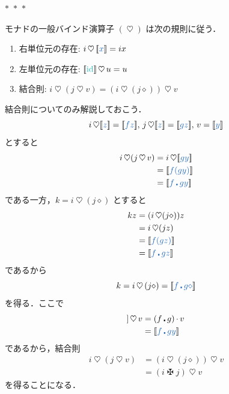 \documentclass[a5paper,twoside,fleqn,draft]{jsbook}
\def\[{[\![}
\def\]{]\!]}
\def\varColor{NavyBlue}
\def\funcColor{BlueGreen}
\newcommand{\separator}{\begin{center}$*$~$*$~$*$\end{center}}
\newcommand{\mVar}[1]{\textcolor{\varColor}{#1}}
\newcommand{\mAnonParam}{\diamond}
\newcommand{\mSpecialFunc}[1]{\textcolor{\funcColor}{\textrm{#1}}}
\DeclareMathOperator{\mId}{\mSpecialFunc{id}}
\DeclareMathOperator{\mBind}{\heartsuit}
\DeclareMathOperator{\mBindComp}{\maltese}
\DeclareMathOperator{\mCompFunc}{\centerdot}
\DeclareMathOperator{\mMap}{\cdot}
\newcommand{\mPureWith}[1]{\[\mVar{#1}\]}
\begin{document}
\separator

モナドの一般バインド演算子 $(\mBind)$ は次の規則に従う．
\begin{enumerate}
\item 右単位元の存在: $i\mBind{}\mPureWith{x}=ix$
\item 左単位元の存在: $\mPureWith{\mId}\mBind u=u$
\item 結合則: $i\mBind{}(j\mBind v)=(i\mBind{}(j\mAnonParam))\mBind v$
\end{enumerate}

結合則についてのみ解説しておこう．
\begin{equation}
i\mBind\mPureWith{z}=\mPureWith{fz},\,
j\mBind\mPureWith{z}=\mPureWith{gz},\,
v=\mPureWith{y}
\end{equation}
とすると
\begin{align}
i\mBind(j\mBind v)&=i\mBind\mPureWith{gy}\\
&=\mPureWith{f(gy)}\\
&=\mPureWith{f\mCompFunc gy}
\end{align}
である一方，$k=i\mBind{}(j\mAnonParam)$ とすると
\begin{align}
kz&=(i\mBind(j\mAnonParam))z\\
&=i\mBind(jz)\\
&=\mPureWith{f(gz)}\\
&=\mPureWith{f\mCompFunc gz}
\end{align}
であるから
\begin{equation}
k=i\mBind{}(j\mAnonParam)=\mPureWith{f\mCompFunc g\mAnonParam}
\end{equation}
を得る．ここで
\begin{align}
\mPureWith{f\mCompFunc g\mAnonParam}\mBind v
&=(f\mCompFunc g)\mMap v\\
&=\mPureWith{f\mCompFunc gy}
\end{align}
であるから，結合則
\begin{align}
  i\mBind{}(j\mBind v)
  &=(i\mBind{}(j\mAnonParam))\mBind v\\
  &=(i\mBindComp j)\mBind v
\end{align}
を得ることになる．
\end{document}
